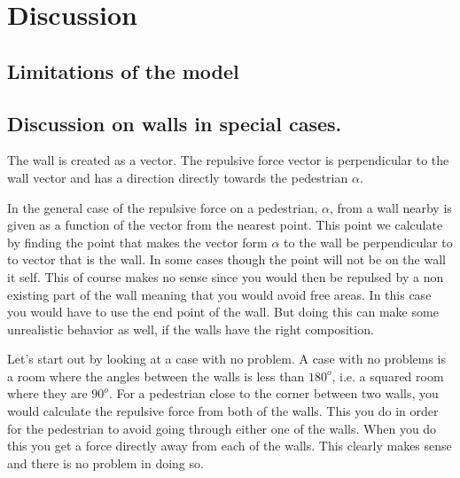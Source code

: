\section{Discussion}\label{sec:discussion}
\subsection{Limitations of the model}

\subsection{Discussion on walls in special cases.}\label{wallEndpoints}
The wall is created as a vector. The repulsive force vector is perpendicular to the wall 
vector and has a direction directly towards the pedestrian $\alpha$.

In the general case of the repulsive force on a pedestrian, $\alpha$, from a wall 
nearby is given as a function of the vector from the nearest point. This point we 
calculate by finding the point that makes the vector form $\alpha$ to the wall be 
perpendicular to to vector that is the wall. In some cases though the point will not 
be on the wall it self. This of course makes no sense since you would then be 
repulsed by a non existing part of the wall meaning that you would avoid free 
areas. In this case you would have to use the end point of the wall. But doing this 
can make some unrealistic behavior as well, if the walls have the right composition. 

Let's start out by looking at a case with no problem. A case with no problems is a 
room where the angles between the walls is less than $180^o$, i.e. a squared room 
where they are $90^o$. For a pedestrian close to the corner between two walls, you 
would calculate the repulsive force from both of the walls. This you do in order 
for the pedestrian to avoid going through either one of the walls. When you do 
this you get a force directly away from each of the walls. This clearly makes 
sense and there is no problem in doing so.

